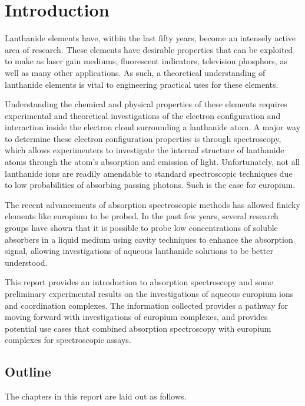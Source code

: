 \chapter*{Introduction}  \label{chap:intro}

Lanthanide elements have, within the last fifty years, become an intensely
active area of research. These elements have desirable properties that can be
exploited to make as laser gain mediums, fluorescent indicators, television
phosphors, as well as many other applications\cite{Bunzli:2005ic}. As such, a theoretical
understanding of lanthanide elements is vital to engineering practical uses for
these elements.

Understanding the chemical and physical properties of these elements requires
experimental and theoretical investigations of the electron configuration and
interaction inside the electron cloud surrounding a lanthanide atom. A major
way to determine these electron configuration properties is through
spectroscopy, which allows experimenters to investigate the internal structure
of lanthanide atoms through the atom's absorption and emission of light.
Unfortunately, not all lanthanide ions are readily amendable to standard
spectroscopic techniques due to low probabilities of absorbing passing photons.
Such is the case for europium.

The recent advancements of absorption spectroscopic methods has allowed finicky
elements like europium to be probed. In the past few years, several research
groups have shown that it is possible to probe low concentrations of soluble
absorbers in a liquid medium using cavity techniques to enhance the absorption
signal, allowing investigations of aqueous lanthanide solutions to be better
understood.

This report provides an introduction to absorption spectroscopy and some
preliminary experimental results on the investigations of aqueous europium ions
and coordination complexes. The information collected provides a pathway for
moving forward with investigations of europium complexes, and provides
potential use cases that combined absorption spectroscopy with europium
complexes for spectroscopic assays.

\section*{Outline}

The chapters in this report are laid out as follows.

